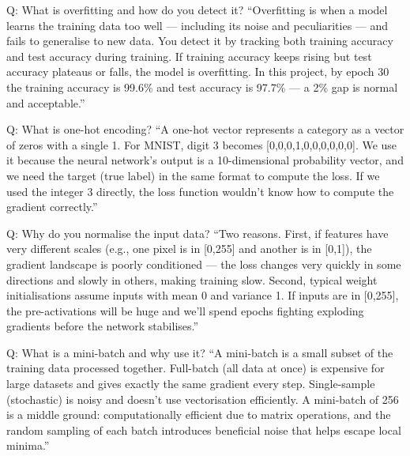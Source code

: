 \documentclass[12pt, a4paper]{article}
\begin{document}
\begin{interviewbox}{Q: What is overfitting and how do you detect it?}
``Overfitting is when a model learns the training data too well --- including its noise and peculiarities --- and fails to generalise to new data. You detect it by tracking both training accuracy and test accuracy during training. If training accuracy keeps rising but test accuracy plateaus or falls, the model is overfitting. In this project, by epoch 30 the training accuracy is 99.6\% and test accuracy is 97.7\% --- a 2\% gap is normal and acceptable.''
\end{interviewbox}

\begin{interviewbox}{Q: What is one-hot encoding?}
``A one-hot vector represents a category as a vector of zeros with a single 1. For MNIST, digit 3 becomes [0,0,0,1,0,0,0,0,0,0]. We use it because the neural network's output is a 10-dimensional probability vector, and we need the target (true label) in the same format to compute the loss. If we used the integer 3 directly, the loss function wouldn't know how to compute the gradient correctly.''
\end{interviewbox}

\begin{interviewbox}{Q: Why do you normalise the input data?}
``Two reasons. First, if features have very different scales (e.g., one pixel is in [0,255] and another is in [0,1]), the gradient landscape is poorly conditioned --- the loss changes very quickly in some directions and slowly in others, making training slow. Second, typical weight initialisations assume inputs with mean 0 and variance 1. If inputs are in [0,255], the pre-activations will be huge and we'll spend epochs fighting exploding gradients before the network stabilises.''
\end{interviewbox}

\begin{interviewbox}{Q: What is a mini-batch and why use it?}
``A mini-batch is a small subset of the training data processed together. Full-batch (all data at once) is expensive for large datasets and gives exactly the same gradient every step. Single-sample (stochastic) is noisy and doesn't use vectorisation efficiently. A mini-batch of 256 is a middle ground: computationally efficient due to matrix operations, and the random sampling of each batch introduces beneficial noise that helps escape local minima.''
\end{interviewbox}
\end{document}
